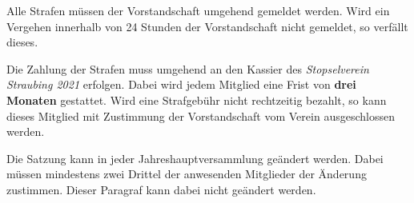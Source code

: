 \documentclass[a4paper,12pt]{scrartcl}
\newcommand{\vereinsName}{Stopselverein Straubing 2021}
\begin{document}
    Alle Strafen müssen der Vorstandschaft umgehend gemeldet werden.
    Wird ein Vergehen innerhalb von 24 Stunden der Vorstandschaft nicht gemeldet,
    so verfällt dieses.

    Die Zahlung der Strafen muss umgehend an den Kassier des \emph{\vereinsName} erfolgen.
    Dabei wird jedem Mitglied eine Frist von \textbf{drei Monaten} gestattet.
    Wird eine Strafgebühr nicht rechtzeitig bezahlt,
    so kann dieses Mitglied mit Zustimmung der Vorstandschaft vom Verein ausgeschlossen werden.

    Die Satzung kann in jeder Jahreshauptversammlung geändert werden.
    Dabei müssen mindestens zwei Drittel der anwesenden Mitglieder der Änderung zustimmen.
    Dieser Paragraf kann dabei nicht geändert werden.

    \clearpage

    \appendix
    
\end{document}

